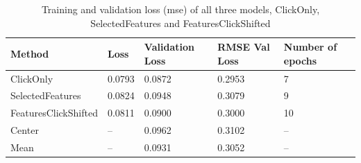 \begin{table}[htbp!]
  \small
  \centering
  \begin{tabular}{|l|l|l|l|l|}
    \hline
    \textbf{Method}      & \textbf{Loss} & \textbf{Validation Loss} & \textbf{RMSE Val Loss}   & \textbf{Number of epochs} \\
    \hline
    ClickOnly            & 0.0793        & 0.0872                   & 0.2953                   & 7                         \\
    SelectedFeatures     & 0.0824        & 0.0948                   & 0.3079                   & 9                         \\
    FeaturesClickShifted & 0.0811        & 0.0900                   & 0.3000                   & 10                        \\
    Center               & --            & 0.0962                   & 0.3102                  & --                         \\
    Mean                 & --            & 0.0931                   & 0.3052                  & --                         \\
    \hline
  \end{tabular}
  \caption[Training and validation loss, number of epochs]{Training and validation loss (\gls{mse}) of all three models, ClickOnly, SelectedFeatures and FeaturesClickShifted}
  \label{tab:model_losses}
\end{table}



